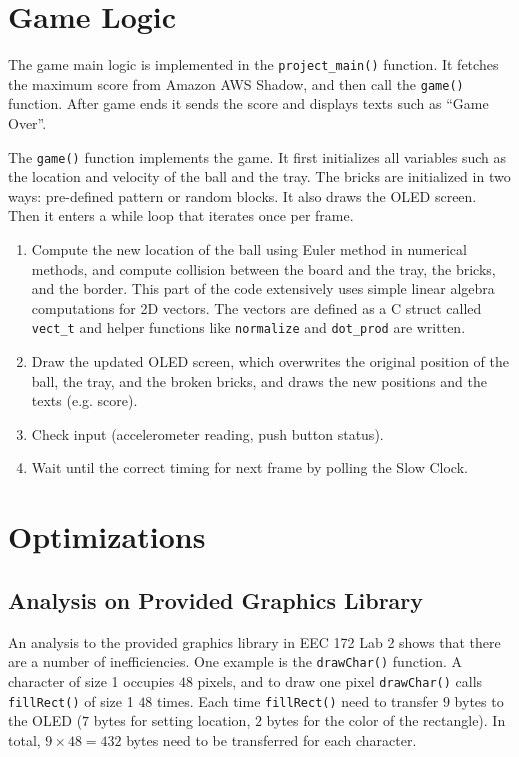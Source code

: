 \documentclass[conference]{IEEEtran}
\begin{document}
\section{Game Logic}
The game main logic is implemented in the \lstinline{project_main()} function.
 It fetches the maximum score from Amazon AWS Shadow, and then call the
 \lstinline{game()} function. After game ends it sends the score and displays
 texts such as ``Game Over''.

The \lstinline{game()} function implements the game. It first initializes all
 variables such as the location and velocity of the ball and the tray. 
 The bricks are initialized in two ways: pre-defined pattern or random blocks.
 It also draws the OLED screen. Then it enters a while loop that iterates once
 per frame.

\begin{enumerate}
\item Compute the new location of the ball using Euler method in
	numerical methods, and compute collision between the board and the tray,
	the bricks, and the border. This part of the code extensively uses simple
	linear algebra computations for 2D vectors. The vectors are defined as a C
	struct called \lstinline{vect_t} and helper functions like
	\lstinline{normalize} and \lstinline{dot_prod} are written.
\item Draw the updated OLED screen, which overwrites the original
	position of the ball, the tray, and the broken bricks, and draws the new
	positions and the texts (e.g. score).
\item Check input (accelerometer reading, push button status).
\item Wait until the correct timing for next frame by polling the Slow Clock.
\end{enumerate}

\section{Optimizations}

\subsection{Analysis on Provided Graphics Library}
\label{graphic-lib-analysis}

An analysis to the provided graphics library in EEC 172 Lab 2 shows that there
 are a number of inefficiencies. One example is the \lstinline{drawChar()}
 function. A character of size 1 occupies $48$ pixels, and to draw one pixel
 \lstinline{drawChar()} calls \lstinline{fillRect()} of size 1 $48$ times.
 Each time \lstinline{fillRect()} need to transfer $9$ bytes to the OLED
 ($7$ bytes for setting location, $2$ bytes for the color of the rectangle).
 In total, $9 \times 48 = 432$ bytes need to be transferred for each character.
\end{document}
